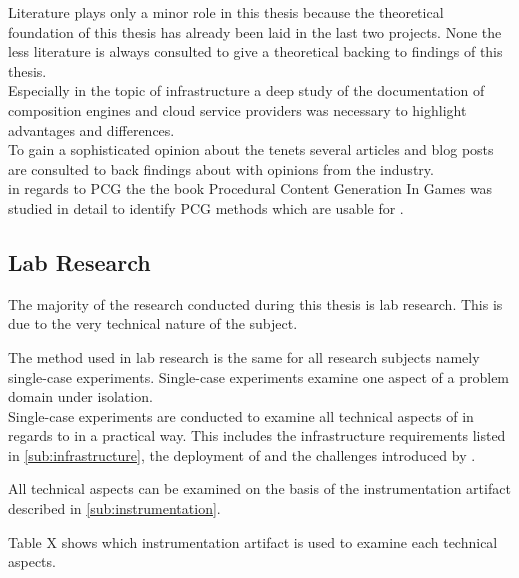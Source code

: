 Literature plays only a minor role in this thesis because the theoretical
foundation of this thesis has already been laid in the last two projects. None
the less literature is always consulted to give a theoretical backing to
findings of this thesis.\\

Especially in the topic of \ms{} infrastructure a deep study of the
documentation of composition engines and cloud service providers was necessary
to highlight advantages and differences.\\

To gain a sophisticated opinion about the \ms{} tenets several articles and blog
posts  are consulted to back findings about \ms{} with
opinions from the industry.\\

in regards to PCG the the book Procedural Content Generation In
Games\cite{shaker2014procedural} was studied in detail to identify PCG methods
which are usable for \ogs{}.

\subsection{Lab Research}
\label{sub:lab_reserach}

The majority of the research conducted during this thesis is lab research. This
is due to the very technical nature of the subject. 

The method used in lab research is the same for all research subjects namely
single-case experiments\cite{wieringa2014design_science}. Single-case
experiments examine one aspect of a problem domain under isolation.\\

Single-case experiments are conducted to examine all technical aspects of \mss{}
in regards to \ogs{} in a practical way. This includes the \ms{} infrastructure
requirements listed in \autoref{sub:infrastructure}, the deployment of \mss{}
and the challenges introduced by \mss{}.

All technical aspects can be examined on the basis of the instrumentation
artifact described in \autoref{sub:instrumentation}.

Table X shows which instrumentation artifact is used to examine each
technical aspects. 

